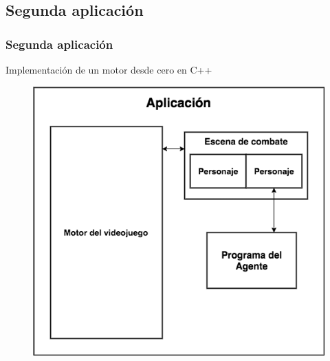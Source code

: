 \documentclass{beamer}
\begin{document}
\subsection{Segunda aplicación}
\begin{frame}
\frametitle{Segunda aplicación}
Implementación de un motor desde cero en C++

\begin{figure}
	\includegraphics[scale=0.3]{../otros/otrasCapturas/block.png} 
\end{figure}

\end{frame}
\end{document}
